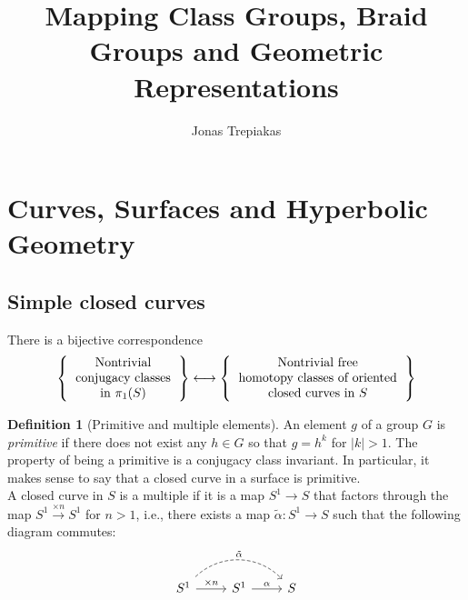 \documentclass[reqno]{amsart}
\title{Mapping Class Groups, Braid Groups and Geometric Representations}
\author{Jonas Trepiakas}
\theoremstyle{definition}
\newtheorem{definition}[theorem]{Definition}
\theoremstyle{remark}
\begin{document}
\maketitle

\tableofcontents

\section{Curves, Surfaces and Hyperbolic Geometry}
    \subsection{Simple closed curves}
There is a bijective correspondence
\[
\left\{ 
    \begin{tabular}{c}
    Nontrivial\\
    conjugacy classes\\
    in $\pi_1 (S)$
\end{tabular}
\right\} 
\longleftrightarrow
\left\{ 
    \begin{tabular}{c}
        Nontrivial free\\
        homotopy classes of oriented\\
        closed curves in $S$
\end{tabular}
\right\} 
\] 

\begin{definition}[Primitive and multiple elements]
    An element $g$ of a group $G$ is \textit{primitive} if there
    does not exist any $h \in G$ so that $g = h^{k}$ for
    $\left| k \right| >1$. The property of being a primitive
    is a conjugacy class invariant. In particular, it makes
    sense to say that a closed curve in a surface is primitive.\\
    A closed curve in $S$ is a multiple if it is a map
    $S^{1} \to S$ that factors through the map
    $S^{1} \stackrel{\times n}{\to } S^{1}$ for
    $n >1$, i.e., there exists a map $\tilde{\alpha} \colon
    S^{1} \to S$ such that the following diagram commutes:
    \begin{equation*}
    \begin{tikzcd}
        S^{1} \ar[r, "\times n"] \ar[rr, bend left = 45, dashed,
        "\tilde{\alpha}"] & S^{1} \ar[r,
        "\alpha"] & S
    \end{tikzcd}
    \end{equation*}
\end{definition}
\end{document}
